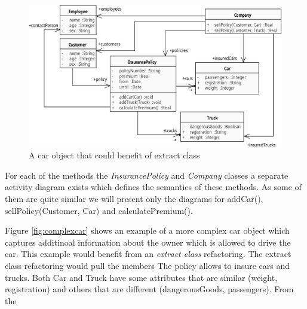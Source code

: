 \documentclass{llncs}
\begin{document}
\begin{figure}[h!t]
 \centering
 \includegraphics[scale=0.7]{images/ClassDiagramComplex.pdf}
 \caption{A car object that could benefit of extract class}
 \label{fig:classdiagramcomplex}
\end{figure}

For each of the methods the \textit{InsurancePolicy} and \textit{Company} classes a separate activity diagram exists which defines the
semantics of these methods. As some of them are quite similar we will present only the diagrams for addCar(), sellPolicy(Customer, Car) and calculatePremium().






Figure \ref{fig:complexcar} shows an example of a more complex car object which captures additinoal information about the owner which is allowed to drive the car. This example would benefit from an \textit{extract class} refactoring. The extract class refactoring would pull the members 
The policy allows to insure cars and trucks. Both Car and Truck have some attributes that are similar (weight, registration) and others that
are different (dangerousGoods, passengers). From the 
\end{document}
